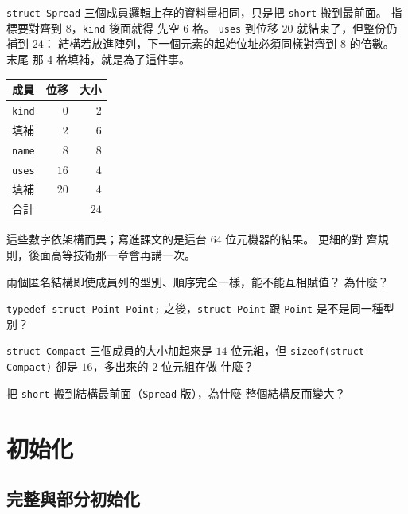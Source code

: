 \texttt{struct Spread} 三個成員邏輯上存的資料量相同，只是把
\texttt{short} 搬到最前面。 指標要對齊到 $8$，\texttt{kind} 後面就得
先空 $6$ 格。 \texttt{uses} 到位移 $20$ 就結束了，但整份仍補到 $24$：
結構若放進陣列，下一個元素的起始位址必須同樣對齊到 $8$ 的倍數。 末尾
那 $4$ 格填補，就是為了這件事。

\begin{center}
\begin{tabular}{|l|r|r|}
\hline
\textbf{成員} & \textbf{位移} & \textbf{大小} \\
\hline
\texttt{kind} & $0$ & $2$ \\
填補 & $2$ & $6$ \\
\texttt{name} & $8$ & $8$ \\
\texttt{uses} & $16$ & $4$ \\
填補 & $20$ & $4$ \\
\hline
合計 &  & $24$ \\
\hline
\end{tabular}
\end{center}


這些數字依架構而異；寫進課文的是這台 $64$ 位元機器的結果。 更細的對
齊規則，後面高等技術那一章會再講一次。

\begin{drills}[label=drills:struct-declare]
\item 兩個匿名結構即使成員列的型別、順序完全一樣，能不能互相賦值？
為什麼？
\item \texttt{typedef struct Point Point;} 之後，\texttt{struct Point}
跟 \texttt{Point} 是不是同一種型別？
\item \texttt{struct Compact} 三個成員的大小加起來是 $14$ 位元組，但
\texttt{sizeof(struct Compact)} 卻是 $16$，多出來的 $2$ 位元組在做
什麼？
\item 把 \texttt{short} 搬到結構最前面（\texttt{Spread} 版），為什麼
整個結構反而變大？
\end{drills}

\section{初始化}
\label{sec:struct-init}

\subsection{完整與部分初始化}

